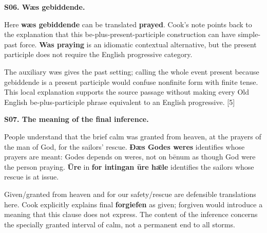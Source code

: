 \par\begin{minipage}{\linewidth}\raggedright
\textbf{S06. Wæs gebiddende.}

Here \textbf{wæs gebiddende} can be translated \textbf{prayed}. Cook's note points back to the explanation that this be-plus-present-participle construction can have simple-past force. \textbf{Was praying} is an idiomatic contextual alternative, but the present participle does not require the English progressive category.

The auxiliary wæs gives the past setting; calling the whole event present because gebiddende is a present participle would confuse nonfinite form with finite tense. This local explanation supports the source passage without making every Old English be-plus-participle phrase equivalent to an English progressive. [5]

\end{minipage}\par\addvspace{4pt}

\par\begin{minipage}{\linewidth}\raggedright
\textbf{S07. The meaning of the final inference.}

People understand that the brief calm was granted from heaven, at the prayers of the man of God, for the sailors' rescue. \textbf{Ðæs Godes weres} identifies whose prayers are meant: Godes depends on weres, not on bēnum as though God were the person praying. \textbf{Ūre} in \textbf{for intingan ūre hǣle} identifies the sailors whose rescue is at issue.

Given/\allowbreak{}granted from heaven and for our safety/\allowbreak{}rescue are defensible translations here. Cook explicitly explains final \textbf{forgiefen} as given; forgiven would introduce a meaning that this clause does not express. The content of the inference concerns the specially granted interval of calm, not a permanent end to all storms.

\end{minipage}\par\addvspace{4pt}

